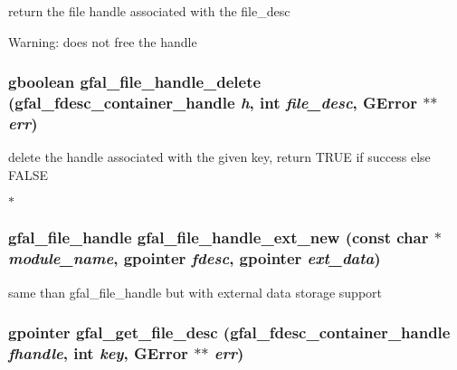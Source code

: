 return the file handle associated with the file\_\-desc \begin{Desc}
\item[Warning:]does not free the handle \end{Desc}
\subsubsection{\setlength{\rightskip}{0pt plus 5cm}gboolean gfal\_\-file\_\-handle\_\-delete (gfal\_\-fdesc\_\-container\_\-handle {\em h}, int {\em file\_\-desc}, GError $\ast$$\ast$ {\em err})}\label{gfal__common__filedescriptor_8h_5434be84154718254a4e90dbcc196359}


delete the handle associated with the given key, return TRUE if success else FALSE

$\ast$ 
\subsubsection{\setlength{\rightskip}{0pt plus 5cm}gfal\_\-file\_\-handle gfal\_\-file\_\-handle\_\-ext\_\-new (const char $\ast$ {\em module\_\-name}, gpointer {\em fdesc}, gpointer {\em ext\_\-data})}\label{gfal__common__filedescriptor_8h_a55408b4cba00997f0c034d5aeffa641}


same than gfal\_\-file\_\-handle but with external data storage support 
\subsubsection{\setlength{\rightskip}{0pt plus 5cm}gpointer gfal\_\-get\_\-file\_\-desc (gfal\_\-fdesc\_\-container\_\-handle {\em fhandle}, int {\em key}, GError $\ast$$\ast$ {\em err})}\label{gfal__common__filedescriptor_8h_91568ee8206643b36d685269b012eb45}


